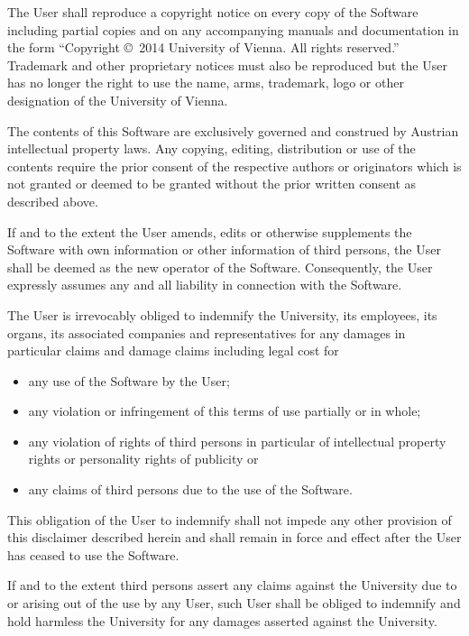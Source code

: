 \documentclass[a4paper,10pt,DIV=15,openany,twoside=false]{scrbook}
\begin{document}
{\begin{shaded}
The User shall reproduce a copyright notice on every copy of the Software including partial copies and on any accompanying manuals and documentation in the form ``Copyright \copyright\ 2014 University of Vienna. All rights reserved.'' Trademark and other proprietary notices must also be reproduced but the User has no longer the right to use the name, arms, trademark, logo or other designation of the University of Vienna.


The contents of this Software are exclusively governed and construed by Austrian intellectual property laws. Any copying, editing, distribution or use of the contents require the prior consent of the respective authors or originators which is not granted or deemed to be granted without the prior written consent as described above.

If and to the extent the User amends, edits or otherwise supplements the Software with own information or other information of third persons, the User shall be deemed as the new operator of the Software. Consequently, the User expressly assumes any and all liability in connection with the Software.


The User is irrevocably obliged to indemnify the University, its employees, its organs, its associated companies and representatives for any damages in particular claims and damage claims including legal cost for
\begin{itemize}
  \item any use of the Software by the User;
  \item any violation or infringement of this terms of use partially or in whole;
  \item any violation of rights of third persons in particular of intellectual property rights or personality rights of publicity or
  \item any claims of third persons due to the use of the Software.
\end{itemize}

This obligation of the User to indemnify shall not impede any other provision of this disclaimer described herein and shall remain in force and effect after the User has ceased to use the Software.

If and to the extent third persons assert any claims against the University due to or arising out of the use by any User, such User shall be obliged to indemnify and hold harmless the University for any damages asserted against the University.


\end{shaded}}
\end{document}
